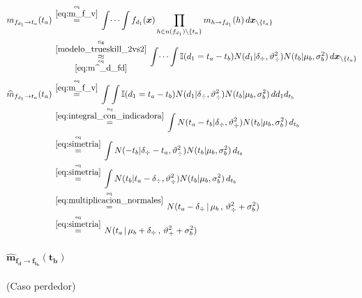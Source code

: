 \documentclass[article]{jss}
\newcommand\hfrac[2]{\genfrac{}{}{0pt}{}{#1}{#2}} %
\begin{document}
\begin{appendix}
\begin{equation}\label{eq:^m_fd_ta}
\begin{split}
m_{f_{d_1} \rightarrow t_a}(t_a) & \overset{\hfrac{\text{eq}}{\ref{eq:m_f_v}}}{=} \int \dots \int f_{d_1}(\bm{x}) \prod_{h \in n(f_{d_1}) \setminus \{t_a\} } m_{h \rightarrow f_{d_1}}(h) \, d\bm{x}_{\setminus \{t_a\} }  \\
&\overset{\hfrac{\text{fig}}{\ref{modelo_trueskill_2vs2}}}{\underset{\hfrac{\text{eq}}{\ref{eq:m^_d_fd}}}{\approx}}  \int \dots \int \mathbb{I}(d_1 = t_a - t_b) N(d_1 | \delta_{\div}, \vartheta_{\div}^2) N(t_b | \mu_b , \sigma_b^2 )  \, d\bm{x}_{\setminus \{t_a\} } \\[0.1cm]
\widehat{m}_{f_{d_1} \rightarrow t_a}(t_a)  & \overset{\hfrac{\text{eq}}{\ref{eq:m_f_v}}}{=} \int \int \mathbb{I}(d_1 = t_a - t_b) N(d_1 | \delta_{\div}, \vartheta_{\div}^2) N(t_b | \mu_b , \sigma_b^2 )  \, d{d_1} d_{t_b} \\
& \overset{\hfrac{\text{eq}}{\ref{eq:integral_con_indicadora}}}{=} \int  N(t_a - t_b | \delta_{\div}, \vartheta_{\div}^2) N(t_b | \mu_b , \sigma_b^2 )  \, d_{t_b} \\
& \overset{\hfrac{\text{eq}}{\ref{eq:simetria}}}{=} \int  N( - t_b | \delta_{\div} - t_a, \vartheta_{\div}^2) N(t_b | \mu_b , \sigma_b^2 )  \, d_{t_b} \\
& \overset{\hfrac{\text{eq}}{\ref{eq:simetria}}}{=} \int  N( t_b | t_a - \delta_{\div}, \vartheta_{\div}^2) N(t_b | \mu_b , \sigma_b^2 )  \,  d_{t_b} \\
& \overset{\hfrac{\text{eq}}{\ref{eq:multiplicacion_normales}}}{=} N(t_a - \delta_{\div} \, | \, \mu_b \, , \, \vartheta_{\div}^2 + \sigma_b^2) \\
& \overset{\hfrac{\text{eq}}{\ref{eq:simetria}}}{=} N(t_a \, | \, \mu_b + \delta_{\div} \, , \, \vartheta_{\div}^2 + \sigma_b^2) \\
\end{split}
\end{equation}


\paragraph{$\bm{\widehat{m}_{f_d \rightarrow f_{t_b}}(t_b)}$} (Caso perdedor)


\end{appendix}
\end{document}
